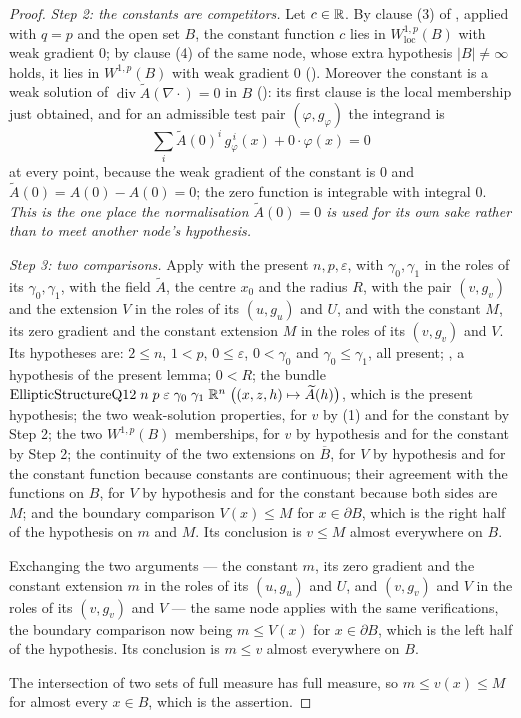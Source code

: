 \begin{proof}
\emph{Step 2: the constants are competitors.}  Let $c\in\mathbb{R}$.  By clause (3) of
, applied with $q=p$ and the open set $B$, the
constant function $c$ lies in $W^{1,p}_{\mathrm{loc}}(B)$ with weak gradient
$0$; by clause (4) of the same node, whose extra hypothesis $|B|\ne\infty$
holds, it lies in $W^{1,p}(B)$ with weak gradient $0$ ().
Moreover the constant is a weak solution of
$\operatorname{div}\widetilde A(\nabla\cdot)=0$ in $B$
(): its first clause is the local membership just
obtained, and for an admissible test pair $(\varphi,g_\varphi)$ the integrand
is
\[
\sum_i\widetilde A(0)^i\,g_\varphi^{\,i}(x)+0\cdot\varphi(x)=0
\]
at every point, because the weak gradient of the constant is $0$ and
$\widetilde A(0)=A(0)-A(0)=0$; the zero function is integrable with integral
$0$.  \emph{This is the one place the normalisation $\widetilde A(0)=0$ is used
for its own sake rather than to meet another node's hypothesis.}

\emph{Step 3: two comparisons.}  Apply  with
the present $n,p,\varepsilon$, with $\gamma_0,\gamma_1$ in the roles of its
$\gamma_0,\gamma_1$, with the field $\widetilde A$, the centre $x_0$ and the
radius $R$, with the pair $(v,g_v)$ and the extension $V$ in the roles of its
$(u,g_u)$ and $U$, and with the constant $M$, its zero gradient and the
constant extension $M$ in the roles of its $(v,g_v)$ and $V$.  Its hypotheses
are: $2\le n$, $1<p$, $0\le\varepsilon$, $0<\gamma_0$ and $\gamma_0\le\gamma_1$,
all present; , a hypothesis of the present
lemma; $0<R$; the bundle
$\mathrm{EllipticStructureQ12}\;n\;p\;\varepsilon\;\gamma_0\;\gamma_1\;\mathbb{R}^n\;
\bigl((x,z,h)\mapsto\widetilde A(h)\bigr)$, which is the present hypothesis;
the two weak-solution properties, for $v$ by (1) and for the constant by
Step 2; the two $W^{1,p}(B)$ memberships, for $v$ by hypothesis and for the
constant by Step 2; the continuity of the two extensions on $\overline B$, for
$V$ by hypothesis and for the constant function because constants are
continuous; their agreement with the functions on $B$, for $V$ by hypothesis
and for the constant because both sides are $M$; and the boundary comparison
$V(x)\le M$ for $x\in\partial B$, which is the right half of the hypothesis on
$m$ and $M$.  Its conclusion is $v\le M$ almost everywhere on $B$.

Exchanging the two arguments --- the constant $m$, its zero gradient and the
constant extension $m$ in the roles of its $(u,g_u)$ and $U$, and $(v,g_v)$ and
$V$ in the roles of its $(v,g_v)$ and $V$ --- the same node applies with the
same verifications, the boundary comparison now being $m\le V(x)$ for
$x\in\partial B$, which is the left half of the hypothesis.  Its conclusion is
$m\le v$ almost everywhere on $B$.

The intersection of two sets of full measure has full measure, so
$m\le v(x)\le M$ for almost every $x\in B$, which is the assertion.
\end{proof}
